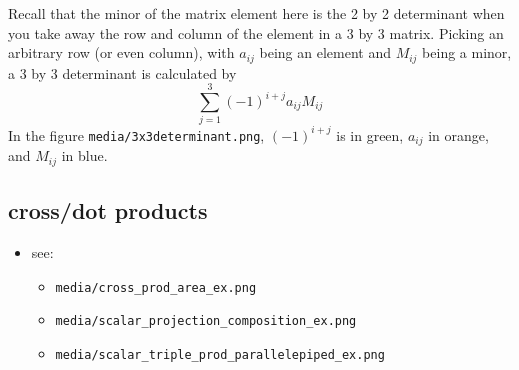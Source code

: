 \documentclass[11pt]{article}
\theoremstyle{definition}
\begin{document}
Recall that the minor of the matrix element here is the 2 by 2 determinant when you take away the row and column of the element in a 3 by 3 matrix.  Picking an arbitrary row (or even column), with $a_{ij}$ being an element and $M_{ij}$ being a minor, a 3 by 3 determinant is calculated by 
\[ \sum_{j=1}^{3} (-1)^{i+j} a_{ij} M_{ij} \]
In the figure \texttt{media/3x3determinant.png}, $(-1)^{i+j}$ is in green, $a_{ij}$ in orange, and $M_{ij}$ in blue.

\subsection*{cross/dot products}
\begin{itemize}
  \item see:
  \begin{itemize}
    \item \texttt{media/cross\_prod\_area\_ex.png}
    \item \texttt{media/scalar\_projection\_composition\_ex.png}
    \item \texttt{media/scalar\_triple\_prod\_parallelepiped\_ex.png}
  \end{itemize}
\end{itemize}






\end{document}

